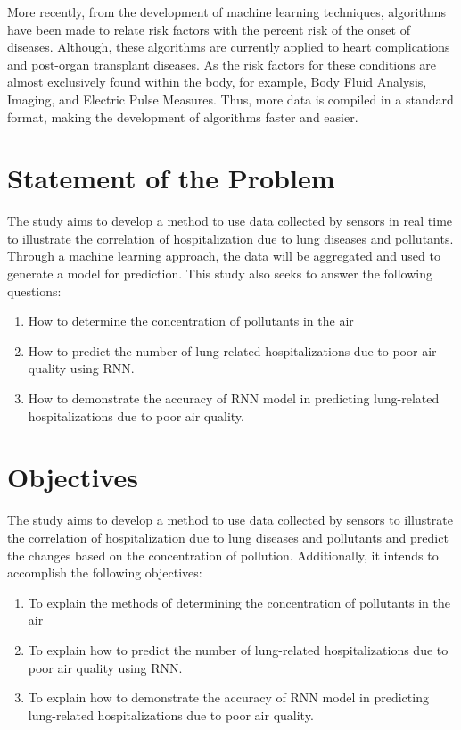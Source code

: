 \documentclass[10pt,11pt,12pt,oneside]{book}
\begin{document}
    More recently, from the development of machine learning techniques, algorithms have been made to relate risk factors with the percent risk of the onset of diseases. Although, these algorithms are currently applied to heart complications and post-organ transplant diseases. As the risk factors for these conditions are almost exclusively found within the body, for example, Body Fluid Analysis, Imaging, and Electric Pulse Measures. Thus, more data is compiled in a standard format, making the development of algorithms faster and easier.
    \section{Statement of the Problem}

    The study aims to develop a method to use data collected by sensors in real time to illustrate the correlation of hospitalization due to lung diseases and pollutants. Through a machine learning approach, the data will be aggregated and used to generate a model for prediction. This study also seeks to answer the following questions:
    \begin{enumerate}
        \item How to determine the concentration of pollutants in the air
        \item How to predict the number of lung-related hospitalizations due to poor air quality using RNN.
        \item How to demonstrate the accuracy of RNN model in predicting lung-related hospitalizations due to poor air quality.
    \end{enumerate}
    \section{Objectives}
    The study aims to develop a method to use data collected by sensors to illustrate the correlation of hospitalization due to lung diseases and pollutants and predict the changes based on the concentration of pollution. Additionally, it intends to accomplish the following objectives:
    \begin{enumerate}
        \item To explain the methods of determining the concentration of pollutants in the air
        \item To explain how to predict the number of lung-related hospitalizations due to poor air quality using RNN.
        \item To explain how to demonstrate the accuracy of RNN model in predicting lung-related hospitalizations due to poor air quality.
    \end{enumerate}
\end{document}
